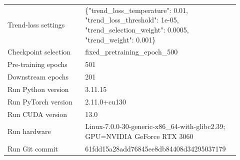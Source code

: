 \begin{table}[p]
\begin{tabular}{p{0.32\linewidth}p{0.60\linewidth}}
Trend-loss settings & \{"trend\_loss\_temperature": 0.01, "trend\_loss\_threshold": 1e-05, "trend\_selection\_weight": 0.0005, "trend\_weight": 0.001\} \\
Checkpoint selection & fixed\_pretraining\_epoch\_500 \\
Pre-training epochs & 501 \\
Downstream epochs & 201 \\
Run Python version & 3.11.15 \\
Run PyTorch version & 2.11.0+cu130 \\
Run CUDA version & 13.0 \\
Run hardware & Linux-7.0.0-30-generic-x86\_64-with-glibc2.39; GPU=NVIDIA GeForce RTX 3060 \\
Run Git commit & 61fdd15a28add76845ee8db84408d34295037179 \\
\bottomrule
\end{tabular}
\end{table}
